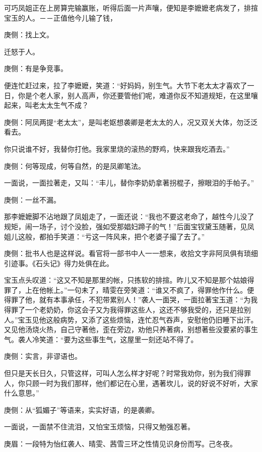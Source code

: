 \begin{parag}
    可巧凤姐正在上房算完输赢账，听得后面一片声嚷，便知是李嬷嬷老病发了，排揎宝玉的人。－－正值他今儿输了钱，\begin{note}庚侧：找上文。\end{note}迁怒于人。\begin{note}庚侧：有是争竞事。\end{note}便连忙赶过来，拉了李嬷嬷，笑道：“好妈妈，别生气。大节下老太太才喜欢了一日，你是个老人家，别人高声，你还要管他们呢，难道你反不知道规矩，在这里嚷起来，叫老太太生气不成？\begin{note}庚侧：阿凤两提“老太太”，是叫老妪想袭卿是老太太的人，况又双关大体，勿泛泛看去。\end{note}你只说谁不好，我替你打他。我家里烧的滚热的野鸡，快来跟我吃酒去。”\begin{note}庚侧：何等现成，何等自然，的是凤卿笔法。\end{note}一面说，一面拉著走，又叫：“丰儿，替你李奶奶拿著拐棍子，擦眼泪的手帕子。”\begin{note}庚侧：一丝不漏。\end{note}那李嬷嬷脚不沾地跟了凤姐走了，一面还说：“我也不要这老命了，越性今儿没了规矩，闹一场子，讨个没脸，强如受那娼妇蹄子的气！”后面宝钗黛玉随著，见凤姐儿这般，都拍手笑道：“亏这一阵风来，把个老婆子撮了去了。”\begin{note}庚侧：批书人也是这样说。看官将一部书中人一一想来，收拾文字非阿凤俱有琐细引迹事。《石头记》得力处俱在此。\end{note}
\end{parag}


\begin{parag}
    宝玉点头叹道：“这又不知是那里的帐，只拣软的排揎。昨儿又不知是那个姑娘得罪了，上在他帐上。”一句未了，晴雯在旁笑道：“谁又不疯了，得罪他作什么。便得罪了他，就有本事承任，不犯带累别人！”袭人一面哭，一面拉著宝玉道：“为我得罪了一个老奶奶，你这会子又为我得罪这些人，这还不够我受的，还只是拉别人。”宝玉见他这般病势，又添了这些烦恼，连忙忍气吞声，安慰他仍旧睡下出汗。又见他汤烧火热，自己守著他，歪在旁边，劝他只养著病，别想著些没要紧的事生气。袭人冷笑道：“要为这些事生气，这屋里一刻还站不得了。\begin{note}庚侧：实言，非谬语也。\end{note}但只是天长日久，只管这样，可叫人怎么样才好呢？时常我劝你，别为我们得罪人，你只顾一时为我们那样，他们都记在心里，遇著坎儿，说的好说不好听，大家什么意思。”\begin{note}庚侧：从“狐媚子”等语来，实实好语，的是袭卿。\end{note}一面说，一面禁不住流泪，又怕宝玉烦恼，只得又勉强忍著。\begin{note}庚眉：一段特为怡红袭人、晴雯、茜雪三环之性情见识身份而写。己冬夜。\end{note}
\end{parag}



